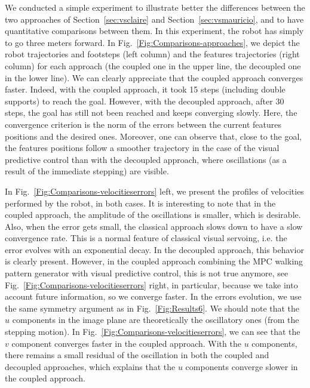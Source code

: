 We conducted a simple experiment to illustrate better the differences between the two approaches of Section~\ref{sec:vsclaire} and Section~\ref{sec:vsmauricio}, and to have quantitative comparisons between them. In this experiment, the robot has simply to go three meters forward. In Fig.~\ref{Fig:Comparisons-approaches}, we depict the robot trajectories and footsteps (left column) and the features trajectories (right column) for each approach (the coupled one in the upper line, the decoupled one in the lower line). We can clearly appreciate that the coupled approach converges faster. Indeed, with the coupled approach, it took 15 steps (including double supports) to reach the goal. However, with the decoupled approach, after 30 steps, the goal  has still not been reached and keeps converging slowly. Here, the convergence criterion is the norm of the errors between the current features positions and the desired ones. Moreover, one can observe that, close to the goal, the features positions follow a smoother trajectory in the case of the visual predictive control than with the decoupled approach, where oscillations (as a result of the immediate stepping) are visible.

In Fig.~\ref{Fig:Comparisons-velocitieserrors} left, we present the profiles of velocities performed by the robot, in both cases. It is interesting to note that in the coupled approach, the amplitude of the oscillations is smaller, which is desirable. Also, when the error gets small, the classical approach slows down to have a slow convergence rate. This is a normal feature of classical visual servoing, i.e. the error evolves with an exponential decay. In the decoupled approach, this behavior is clearly present. However, in the coupled approach combining the MPC walking pattern generator with visual predictive control, this is not true anymore, see Fig.~\ref{Fig:Comparisons-velocitieserrors} right, in particular, because we take into account future information, so we converge faster. In the errors evolution, we use the same symmetry argument as in Fig.~\ref{Fig:Results6}. We should note that the $u$ components in the image plane are theoretically the oscillatory ones (from the stepping motion). In Fig.~\ref{Fig:Comparisons-velocitieserrors}, we can see that the $v$ component converges faster in the coupled approach. With the $u$ components, there remains a small residual of the oscillation in both the coupled and decoupled approaches, which explains that the $u$ components converge slower in the coupled approach.



